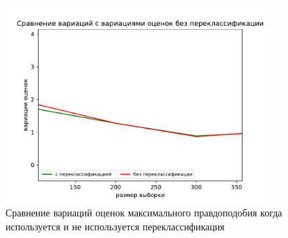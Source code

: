 \begin{figure}[ht!]
    \centering
    \includegraphics[width=100mm]{../images/on_off_recl.pdf}
    \caption{Сравнение вариаций оценок максимального правдоподобия когда используется и не используется переклассификация\label{overflow}}
    \label{pic2}
\end{figure}


